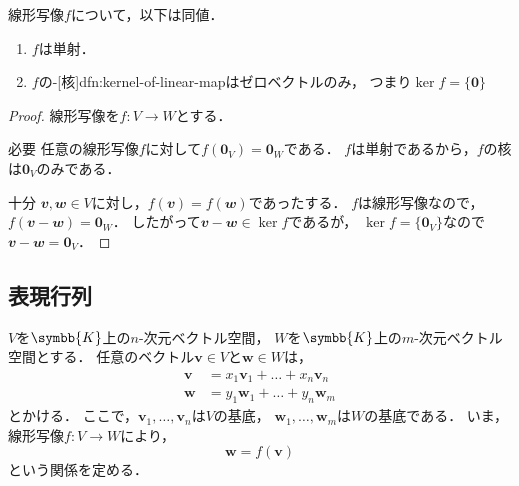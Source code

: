 \documentclass[../sotsu.tex]{subfiles}
\begin{document}
\begin{proposition}
    \label{thm:linear-map-injective}
    線形写像$f$について，以下は同値．
    \begin{enumerate}
        \item $f$は単射．
        \item $f$の-[核]{dfn:kernel-of-linear-map}はゼロベクトルのみ，
            つまり$\ker f = \{ \symbf{0} \}$
    \end{enumerate}
\end{proposition}

\begin{proof}
    線形写像を$f \colon V \to W$とする．

    \textsf{必要} \quad 
    任意の線形写像$f$に対して$f(\symbf{0}_V) = \symbf{0}_W$である．
    $f$は単射であるから，$f$の核は$\symbf{0}_V$のみである．

    \textsf{十分} \quad 
    $𝒗, 𝒘 \in V$に対し，$f(𝒗) = f(𝒘)$であったする．
    $f$は線形写像なので，$f(𝒗 - 𝒘) = \symbf{0}_W$．
    したがって$𝒗 - 𝒘 \in \ker f$であるが，
    $\ker f = \{ \symbf{0}_V \}$なので$𝒗 - 𝒘 = \symbf{0}_V$．
\end{proof}



\subsection{表現行列}
\label{representation-matrix}

$V$を$\symbb{K}$上の$n$-次元ベクトル空間，
$W$を$\symbb{K}$上の$m$-次元ベクトル空間とする．
任意のベクトル$\symbf{v} \in V$と$\symbf{w} \in W$は，
\begin{equation*}
    \begin{aligned}
        \symbf{v} &= x_1 \symbf{v}_1 + \dots + x_n \symbf{v}_n  \\
        \symbf{w} &= y_1 \symbf{w}_1 + \dots + y_n \symbf{w}_m
    \end{aligned}
\end{equation*}
とかける．
ここで，$\symbf{v}_1, \dots, \symbf{v}_n$は$V$の基底，
$\symbf{w}_1, \dots, \symbf{w}_m$は$W$の基底である．
いま，線形写像$f \colon V \to W$により，
\begin{equation*}
    \symbf{w} = f(\symbf{v})
\end{equation*}
という関係を定める．
\end{document}
